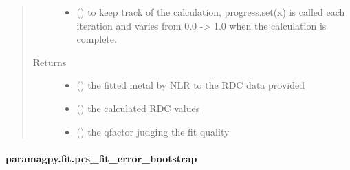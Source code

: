 \documentclass[a4paper,10pt,english]{sphinxmanual}
\begin{document}
\begin{fulllineitems}
\begin{quote}
\begin{description}
\begin{itemize}
\item {} 
 (\sphinxstyleliteralemphasis{\sphinxupquote{, }}) \textendash{} to keep track of the calculation, progress.set(x) is called each
iteration and varies from 0.0 -\textgreater{} 1.0 when the calculation is complete.

\end{itemize}

\item[{Returns}] \leavevmode
\begin{itemize}
\item {} 
 () \textendash{} the fitted metal by NLR to the RDC data provided

\item {} 
 () \textendash{} the calculated RDC values

\item {} 
 () \textendash{} the qfactor judging the fit quality

\end{itemize}


\end{description}\end{quote}

\end{fulllineitems}



\paragraph{paramagpy.fit.pcs\_fit\_error\_bootstrap}
\label{\detokenize{reference/generated/paramagpy.fit.pcs_fit_error_bootstrap:paramagpy-fit-pcs-fit-error-bootstrap}}\label{\detokenize{reference/generated/paramagpy.fit.pcs_fit_error_bootstrap::doc}}
\end{document}
